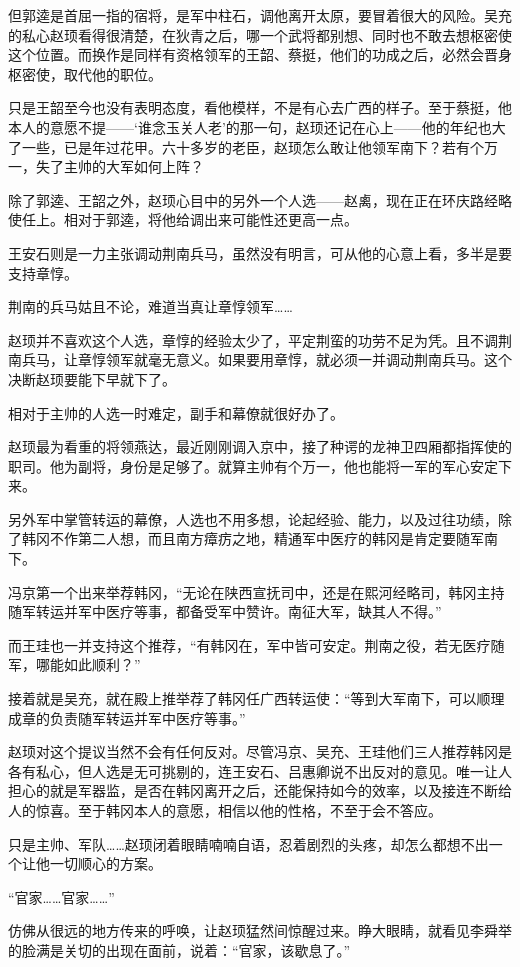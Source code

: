 但郭逵是首屈一指的宿将，是军中柱石，调他离开太原，要冒着很大的风险。吴充的私心赵顼看得很清楚，在狄青之后，哪一个武将都别想、同时也不敢去想枢密使这个位置。而换作是同样有资格领军的王韶、蔡挺，他们的功成之后，必然会晋身枢密使，取代他的职位。

只是王韶至今也没有表明态度，看他模样，不是有心去广西的样子。至于蔡挺，他本人的意愿不提——‘谁念玉关人老’的那一句，赵顼还记在心上——他的年纪也大了一些，已是年过花甲。六十多岁的老臣，赵顼怎么敢让他领军南下？若有个万一，失了主帅的大军如何上阵？

除了郭逵、王韶之外，赵顼心目中的另外一个人选——赵禼，现在正在环庆路经略使任上。相对于郭逵，将他给调出来可能性还更高一点。

王安石则是一力主张调动荆南兵马，虽然没有明言，可从他的心意上看，多半是要支持章惇。

荆南的兵马姑且不论，难道当真让章惇领军……

赵顼并不喜欢这个人选，章惇的经验太少了，平定荆蛮的功劳不足为凭。且不调荆南兵马，让章惇领军就毫无意义。如果要用章惇，就必须一并调动荆南兵马。这个决断赵顼要能下早就下了。

相对于主帅的人选一时难定，副手和幕僚就很好办了。

赵顼最为看重的将领燕达，最近刚刚调入京中，接了种谔的龙神卫四厢都指挥使的职司。他为副将，身份是足够了。就算主帅有个万一，他也能将一军的军心安定下来。

另外军中掌管转运的幕僚，人选也不用多想，论起经验、能力，以及过往功绩，除了韩冈不作第二人想，而且南方瘴疠之地，精通军中医疗的韩冈是肯定要随军南下。

冯京第一个出来举荐韩冈，“无论在陕西宣抚司中，还是在熙河经略司，韩冈主持随军转运并军中医疗等事，都备受军中赞许。南征大军，缺其人不得。”

而王珪也一并支持这个推荐，“有韩冈在，军中皆可安定。荆南之役，若无医疗随军，哪能如此顺利？”

接着就是吴充，就在殿上推举荐了韩冈任广西转运使：“等到大军南下，可以顺理成章的负责随军转运并军中医疗等事。”

赵顼对这个提议当然不会有任何反对。尽管冯京、吴充、王珪他们三人推荐韩冈是各有私心，但人选是无可挑剔的，连王安石、吕惠卿说不出反对的意见。唯一让人担心的就是军器监，是否在韩冈离开之后，还能保持如今的效率，以及接连不断给人的惊喜。至于韩冈本人的意愿，相信以他的性格，不至于会不答应。

只是主帅、军队……赵顼闭着眼睛喃喃自语，忍着剧烈的头疼，却怎么都想不出一个让他一切顺心的方案。

“官家……官家……”

仿佛从很远的地方传来的呼唤，让赵顼猛然间惊醒过来。睁大眼睛，就看见李舜举的脸满是关切的出现在面前，说着：“官家，该歇息了。”


